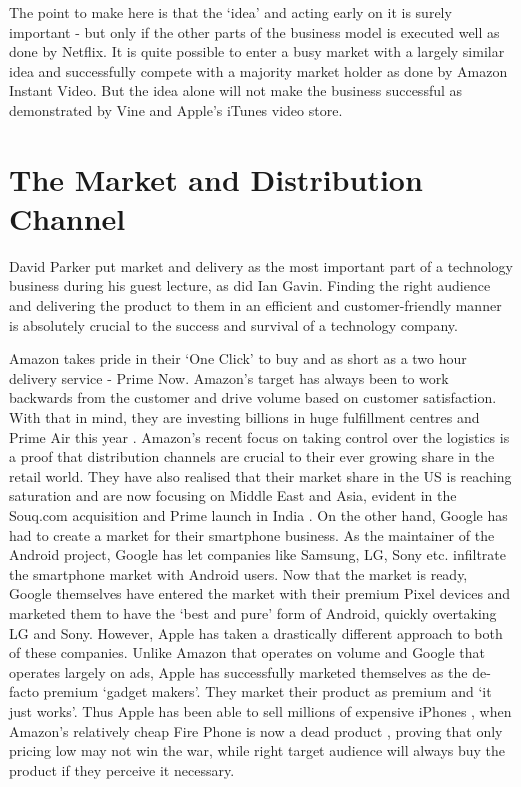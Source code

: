 \documentclass[twocolumn]{bmcart}%
\begin{document}
\par The point to make here is that the `idea' and acting early on it is surely important - but only if the other parts of the business model is executed well as done by Netflix. It is quite possible to enter a busy market with a largely similar idea and successfully compete with a majority market holder as done by Amazon Instant Video. But the idea alone will not make the business successful as demonstrated by Vine and Apple's iTunes video store.

\section*{The Market and Distribution Channel}
David Parker put market and delivery as the most important part of a technology business during his guest lecture, as did Ian Gavin. Finding the right audience and delivering the product to them in an efficient and customer-friendly manner is absolutely crucial to the success and survival of a technology company.\\

\par Amazon takes pride in their `One Click' to buy and as short as a two hour delivery service - Prime Now. Amazon's target has always been to work backwards from the customer and drive volume based on customer satisfaction. With that in mind, they are investing billions in huge fulfillment centres and Prime Air this year \cite{lesliehook2016}. Amazon's recent focus on taking control over the logistics is a proof that distribution channels are crucial to their ever growing share in the retail world. They have also realised that their market share in the US is reaching saturation and are now focusing on Middle East and Asia, evident in the Souq.com acquisition \cite{simeonkerr2017} and Prime launch in India \cite{simonmundy2016}. On the other hand, Google has had to create a market for their smartphone business. As the maintainer of the Android project, Google has let companies like Samsung, LG, Sony etc. infiltrate the smartphone market with Android users. Now that the market is ready, Google themselves have entered the market with their premium Pixel devices and marketed them to have the `best and pure' form of Android, quickly overtaking LG and Sony. However, Apple has taken a drastically different approach to both of these companies. Unlike Amazon that operates on volume and Google that operates largely on ads, Apple has successfully marketed themselves as the de-facto premium `gadget makers'. They market their product as premium and `it just works'. Thus Apple has been able to sell millions of expensive iPhones \cite{tessstynes2015}, when Amazon's relatively cheap Fire Phone is now a dead product \cite{jacobkastrenakes2015}, proving that only pricing low may not win the war, while right target audience will always buy the product if they perceive it necessary.\\
\end{document}
